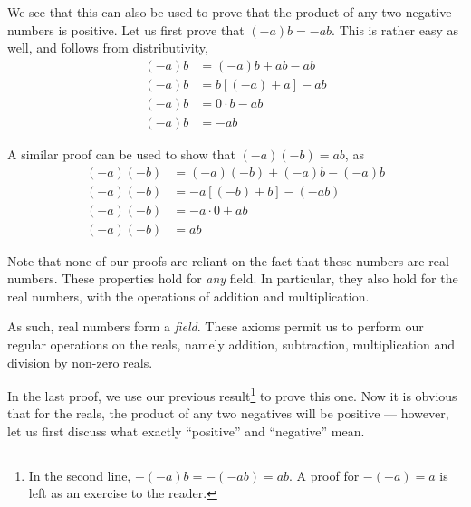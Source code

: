 We see that this can also be used to prove that the product of any two negative numbers is 
positive. Let us first prove that \((-a)b = -ab\). This is rather easy as well, and follows 
from distributivity,
\begin{align*}
    (-a)b &= (-a)b + ab - ab \\
    (-a)b &= b[(-a) + a] - ab \\
    (-a)b & = 0 \cdot b - ab\\
    (-a)b &= -ab
\end{align*}

A similar proof can be used to show that \((-a)(-b) = ab\), as 
\begin{align*}
    (-a)(-b) &= (-a)(-b) + (-a)b - (-a)b \\
    (-a)(-b) &= -a[(-b) + b] - (-ab) \\
    (-a)(-b) &= -a \cdot 0 + ab\\
    (-a)(-b) &= ab
\end{align*}

Note that none of our proofs are reliant on the fact that these numbers are 
real numbers. These properties hold for \emph{any} field. In particular, 
they also hold for the real numbers, with the operations of addition and multiplication.

As such, real numbers form a \emph{field}. These axioms permit us to perform our regular operations on 
the reals, namely addition, subtraction, multiplication and division by non-zero
reals.

In the last proof, we use our previous result\footnote{In the second line, \(-(-a)b = -(-ab) = ab\). A proof for \(-(-a) = a\) is left as 
an exercise to the reader.} to prove this one. Now it is obvious that for 
the reals, the product of any two negatives will be positive --- however, let us first discuss what exactly ``positive''
and ``negative'' mean.

